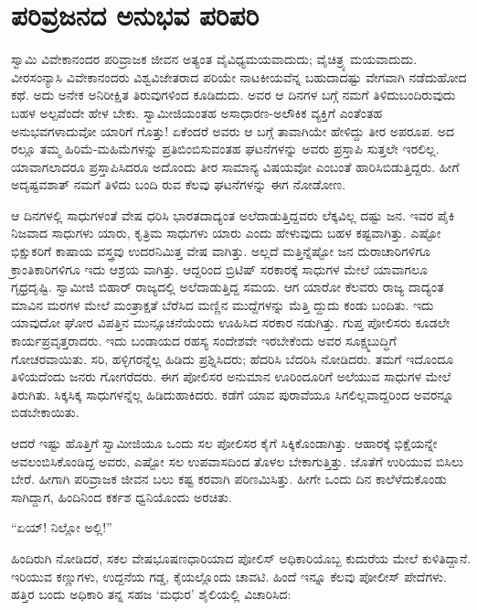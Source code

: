 
\chapter{ಪರಿವ್ರಜನದ ಅನುಭವ ಪರಿಪರಿ}

\noindent

ಸ್ವಾಮಿ ವಿವೇಕಾನಂದರ ಪರಿವ್ರಾಜಕ ಜೀವನ ಅತ್ಯಂತ ವೈವಿಧ್ಯಮಯವಾದುದು; ವೈಚಿತ್ರ್ಯ ಮಯವಾದುದು. ವೀರಸಂನ್ಯಾಸಿ ವಿವೇಕಾನಂದರು ವಿಶ್ವವಿಜೇತರಾದ ಪರಿಯೇ ನಾಟಕೀಯವೆನ್ನ ಬಹುದಾದಷ್ಟು ವೇಗವಾಗಿ ನಡೆದುಹೋದ ಕಥೆ. ಅದು ಅನೇಕ ಅನಿರೀಕ್ಷಿತ ತಿರುವುಗಳಿಂದ ಕೂಡಿದುದು. ಅವರ ಆ ದಿನಗಳ ಬಗ್ಗೆ ನಮಗೆ ತಿಳಿದುಬಂದಿರುವುದು ಬಹಳ ಅಲ್ಪವೆಂದೇ ಹೇಳ ಬೇಕು. ಸ್ವಾಮೀಜಿಯಂತಹ ಅಸಾಧಾರಣ-ಅಲೌಕಿಕ ವ್ಯಕ್ತಿಗೆ ಎಂತೆಂತಹ ಅನುಭವಗಳಾದುವೋ ಯಾರಿಗೆ ಗೊತ್ತು! ಏಕೆಂದರೆ ಅವರು ಆ ಬಗ್ಗೆ ತಾವಾಗಿಯೇ ಹೇಳಿದ್ದು ತೀರ ಅಪರೂಪ. ಅದ ರಲ್ಲೂ ತಮ್ಮ ಹಿರಿಮೆ-ಮಹಿಮೆಗಳನ್ನು ಪ್ರತಿಬಿಂಬಿಸುವಂತಹ ಘಟನೆಗಳನ್ನು ಅವರು ಪ್ರಸ್ತಾಪಿ ಸುತ್ತಲೇ ಇರಲಿಲ್ಲ. ಯಾವಾಗಲಾದರೂ ಪ್ರಸ್ತಾಪಿಸಿದರೂ ಅದೊಂದು ತೀರ ಸಾಮಾನ್ಯ ವಿಷಯವೋ ಎಂಬಂತೆ ಹಾರಿಸಿಬಿಡುತ್ತಿದ್ದರು. ಹೀಗೆ ಅದೃಷ್ಟವಶಾತ್ ನಮಗೆ ತಿಳಿದು ಬಂದಿ ರುವ ಕೆಲವು ಘಟನೆಗಳನ್ನು ಈಗ ನೋಡೋಣ.

ಆ ದಿನಗಳಲ್ಲಿ ಸಾಧುಗಳಂತೆ ವೇಷ ಧರಿಸಿ ಭಾರತದಾದ್ಯಂತ ಅಲೆದಾಡುತ್ತಿದ್ದವರು ಲೆಕ್ಕವಿಲ್ಲ ದಷ್ಟು ಜನ. ಇವರ ಪೈಕಿ ನಿಜವಾದ ಸಾಧುಗಳು ಯಾರು, ಕೃತ್ರಿಮ ಸಾಧುಗಳು ಯಾರು ಎಂದು ಹೇಳುವುದು ಬಹಳ ಕಷ್ಟವಾಗಿತ್ತು. ಎಷ್ಟೋ ಭಿಕ್ಷುಕರಿಗೆ ಕಾಷಾಯ ವಸ್ತ್ರವು ಉದರನಿಮಿತ್ತ ವೇಷ ವಾಗಿತ್ತು. ಅಲ್ಲದೆ ಮತ್ತಿನ್ನೆಷ್ಟೋ ಜನ ದುರಾಚಾರಿಗಳಿಗೂ ಕ್ರಾಂತಿಕಾರಿಗಳಿಗೂ ಇದು ಆಶ್ರಯ ವಾಗಿತ್ತು. ಆದ್ದರಿಂದ ಬ್ರಿಟಿಷ್ ಸರಕಾರಕ್ಕೆ ಸಾಧುಗಳ ಮೇಲೆ ಯಾವಾಗಲೂ ಗೃಧ್ರದೃಷ್ಟಿ. ಸ್ವಾಮೀಜಿ ಬಿಹಾರ್ ರಾಜ್ಯದಲ್ಲಿ ಅಲೆದಾಡುತ್ತಿದ್ದ ಸಮಯ. ಆಗ ಯಾರೋ ಕೆಲವರು ರಾಜ್ಯ ದಾದ್ಯಂತ ಮಾವಿನ ಮರಗಳ ಮೇಲೆ ಮಂತ್ರಾಕ್ಷತೆ ಬೆರೆಸಿದ ಮಣ್ಣಿನ ಮುದ್ದೆಗಳನ್ನು ಮೆತ್ತಿ ದ್ದುದು ಕಂಡು ಬಂದಿತು. ಇದು ಯಾವುದೋ ಘೋರ ವಿಪತ್ತಿನ ಮುನ್ಸೂಚನೆಯೆಂದು ಊಹಿಸಿದ ಸರಕಾರ ನಡುಗಿತ್ತು. ಗುಪ್ತ ಪೋಲಿಸರು ಕೂಡಲೇ ಕಾರ್ಯಪ್ರವೃತ್ತರಾದರು. ಇದು ಬಂಡಾಯದ ರಹಸ್ಯ ಸಂದೇಶವೇ ಇರಬೇಕೆಂದು ಅವರ ಸೂಕ್ಷ್ಮಬುದ್ಧಿಗೆ ಗೋಚರವಾಯಿತು. ಸರಿ, ಹಳ್ಳಿಗರನ್ನೆಲ್ಲ ಹಿಡಿದು ಪ್ರಶ್ನಿಸಿದರು; ಹೆದರಿಸಿ ಬೆದರಿಸಿ ನೋಡಿದರು. ತಮಗೆ ಇದೊಂದೂ ತಿಳಿಯದೆಂದು ಜನರು ಗೋಗರೆದರು. ಈಗ ಪೋಲಿಸರ ಅನುಮಾನ ಊರಿಂದೂರಿಗೆ ಅಲೆಯುವ ಸಾಧುಗಳ ಮೇಲೆ ತಿರುಗಿತು. ಸಿಕ್ಕಸಿಕ್ಕ ಸಾಧುಗಳನ್ನೆಲ್ಲ ಹಿಡಿದುಹಾಕಿದರು. ಕಡೆಗೆ ಯಾವ ಪುರಾವೆಯೂ ಸಿಗಲಿಲ್ಲವಾದ್ದರಿಂದ ಅವರನ್ನೂ ಬಿಡಬೇಕಾಯಿತು.

ಆದರೆ ಇಷ್ಟು ಹೊತ್ತಿಗೆ ಸ್ವಾಮೀಜಿಯೂ ಒಂದು ಸಲ ಪೋಲಿಸರ ಕೈಗೆ ಸಿಕ್ಕಿಕೊಂಡಾಗಿತ್ತು. ಆಹಾರಕ್ಕೆ ಭಿಕ್ಷೆಯನ್ನೇ ಅವಲಂಬಿಸಿಕೊಂಡಿದ್ದ ಅವರು, ಎಷ್ಟೋ ಸಲ ಉಪವಾಸದಿಂದ ತೊಳಲ ಬೇಕಾಗುತ್ತಿತ್ತು. ಜೊತೆಗೆ ಉರಿಯುವ ಬಿಸಿಲು ಬೇರೆ. ಹೀಗಾಗಿ ಪರಿವ್ರಾಜಕ ಜೀವನ ಬಲು ಕಷ್ಟ ಕರವಾಗಿ ಪರಿಣಮಿಸಿತ್ತು. ಹೀಗೇ ಒಂದು ದಿನ ಕಾಲೆಳೆದುಕೊಂಡು ಸಾಗಿದ್ದಾಗ, ಹಿಂದಿನಿಂದ ಕರ್ಕಶ ಧ್ವನಿಯೊಂದು ಅರಚಿತು.

“ಏಯ್! ನಿಲ್ಲೋ ಅಲ್ಲಿ!”

ಹಿಂದಿರುಗಿ ನೋಡಿದರೆ, ಸಕಲ ವೇಷಭೂಷಣಧಾರಿಯಾದ ಪೋಲಿಸ್ ಅಧಿಕಾರಿಯೊಬ್ಬ ಕುದುರೆಯ ಮೇಲೆ ಕುಳಿತಿದ್ದಾನೆ. ಇರಿಯುವ ಕಣ್ಣುಗಳು, ಉದ್ದನೆಯ ಗಡ್ಡ, ಕೈಯಲ್ಲೊಂದು ಚಾವಟಿ. ಹಿಂದೆ ಇನ್ನೂ ಕೆಲವು ಪೋಲೀಸ್ ಪೇದೆಗಳು. ಹತ್ತಿರ ಬಂದು ಅಧಿಕಾರಿ ತನ್ನ ಸಹಜ ‘ಮಧುರ’ ಶೈಲಿಯಲ್ಲಿ ವಿಚಾರಿಸಿದ:

